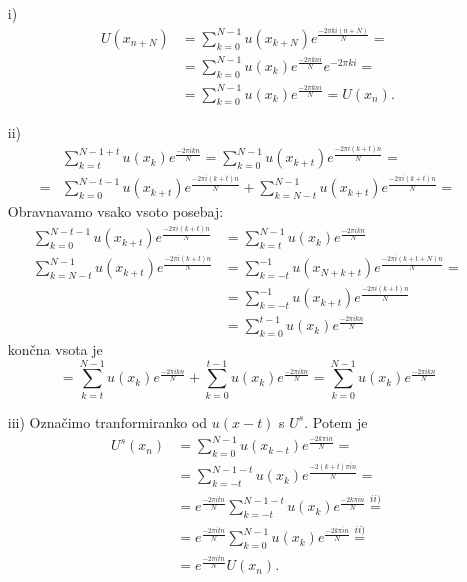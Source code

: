 \documentclass[mat2, tisk]{fmfdelo}
\begin{document}
\begin{dokaz}
  \hfill
\begin{enumerate}
  \item[i)]
  \begin{align*}
    U(x_{n+N}) &= \sum_{k=0}^{N-1} u(x_{k+N}) e^{\frac{-2\pi k i(n+N)}{N}} = \\
    &= \sum_{k=0}^{N-1} u(x_k) e^{\frac{-2\pi k n i}{N}} e^{-2\pi k i} = \\
    &= \sum_{k=0}^{N-1} u(x_k) e^{\frac{-2\pi k n i}{N}} = U(x_n).
  \end{align*}
\newpage
  \item[ii)]
  \begin{align*}
    &\sum_{k=t}^{N-1 + t} u(x_k) e^{\frac{-2\pi i k n}{N}} = \sum_{k=0}^{N-1} u(x_{k+t}) e^{\frac{-2\pi i (k+t) n}{N}} = \\
    =&\sum_{k=0}^{N-t-1} u(x_{k+t}) e^{\frac{-2\pi i (k+t) n}{N}} + 
    \sum_{k=N-t}^{N-1} u(x_{k+t}) e^{\frac{-2\pi i (k+t) n}{N}} = 
  \end{align*}
Obravnavamo vsako vsoto posebaj: 
\begin{align*}
\sum_{k=0}^{N-t-1} u(x_{k+t}) e^{\frac{-2\pi i (k+t) n}{N}} &= 
\sum_{k=t}^{N-1} u(x_{k}) e^{\frac{-2\pi i k n}{N}}\\[5mm]
  \sum_{k=N-t}^{N-1} u(x_{k+t}) e^{\frac{-2\pi i (k+t) n}{N}} &= 
  \sum_{k=-t}^{-1} u(x_{N+k+t}) e^{\frac{-2\pi i (k+t+N) n}{N}} = \\
  &= \sum_{k=-t}^{-1} u(x_{k+t}) e^{\frac{-2\pi i (k+t) n}{N}} \\
  &= \sum_{k=0}^{t-1} u(x_{k}) e^{\frac{-2\pi i k n}{N}}
\end{align*}
končna vsota je 
$$
= \sum_{k=t}^{N-1} u(x_{k}) e^{\frac{-2\pi i k n}{N}} + \sum_{k=0}^{t-1} u(x_{k}) e^{\frac{-2\pi i k n}{N}} = 
\sum_{k=0}^{N-1} u(x_{k}) e^{\frac{-2\pi i k n}{N}}
$$

\item[iii)] 
Označimo tranformiranko od $u(x-t)$ s $U^s$. Potem je 
  \begin{align*}
    U^s(x_{n}) &= \sum_{k=0}^{N-1} u(x_{k-t}) e^{\frac{-2k \pi i n}{N}} = \\
    &= \sum_{k=-t}^{N-1-t} u(x_{k}) e^{\frac{-2(k+t) \pi i n}{N}} = \\
    &= e^{\frac{-2\pi i t n}{N}} \sum_{k=-t}^{N-1-t} u(x_{k}) e^{\frac{-2k \pi i n}{N}} \stackrel{ii)}{=} \\
    &=e^{\frac{-2\pi i t n}{N}} \sum_{k=0}^{N-1} u(x_{k}) e^{\frac{-2k \pi i n}{N}} \stackrel{ii)}{=} \\
    &= e^{\frac{-2\pi i t n}{N}} U(x_n).
  \end{align*}


\end{enumerate}
\end{dokaz}
\end{document}
